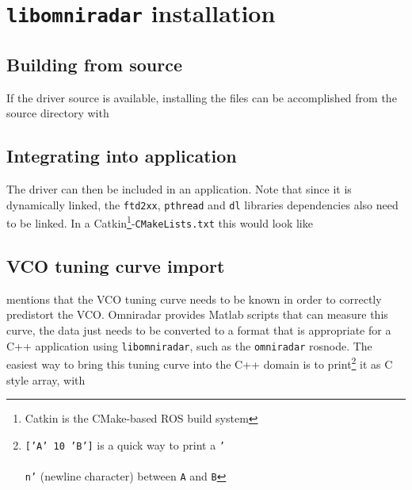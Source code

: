 \chapter{\texttt{libomniradar} installation} \label{install}

\section{Building from source}
If the driver source is available, installing the files can be
accomplished from the source directory with

\begin{Shaded}
\begin{Highlighting}[]
\KeywordTok{\&\&} 
\end{Highlighting}
\end{Shaded}


\section{Integrating into application}
The driver can then be included in an application. Note that since it is
dynamically linked, the \texttt{ftd2xx}, \texttt{pthread} and
\texttt{dl} libraries dependencies also need to be linked. In a Catkin\footnote{Catkin is the CMake-based ROS build system}-\texttt{CMakeLists.txt}
this would look like

\begin{Shaded}
\begin{Highlighting}[]
\NormalTok{(}
\NormalTok{)}
\end{Highlighting}
\end{Shaded}

\section{VCO tuning curve import} \label{vcotune}

 mentions that the VCO tuning curve needs to be known in order to correctly predistort the VCO.
Omniradar provides Matlab scripts that can measure this curve, the data just needs to be converted to a format that is appropriate for a C++ application using \texttt{libomniradar}, such as the \texttt{omniradar} rosnode.
The easiest way to bring this tuning curve into the C++ domain is to
print\footnote{\texttt{['A' 10 'B']} is a quick way to print a \texttt{'\\\\n'} (newline character) between \texttt{A} and \texttt{B}}
it as C style array, with

